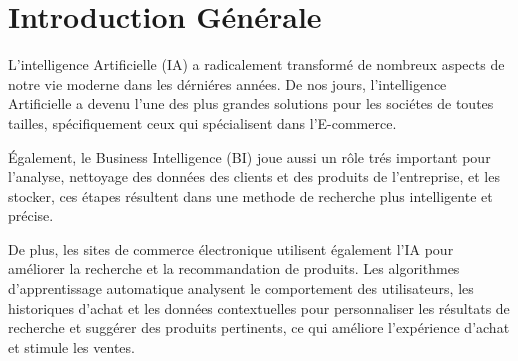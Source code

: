 \chapter{Introduction Générale}
\localtableofcontents

\newpage

\noindent
L'intelligence Artificielle (IA) a radicalement transformé de nombreux aspects de notre vie moderne dans les dérniéres années. De nos jours, l'intelligence Artificielle a devenu l'une des plus grandes solutions pour les sociétes de toutes tailles, spécifiquement ceux qui spécialisent dans l'E-commerce.

\noindent
Également, le Business Intelligence (BI) joue aussi un rôle trés important pour l'analyse, nettoyage des données des clients et des produits de l'entreprise, et les stocker, ces étapes résultent dans une methode de recherche plus intelligente et précise.

\noindent
De plus, les sites de commerce électronique utilisent également l'IA pour améliorer la recherche et la recommandation de produits. Les algorithmes d'apprentissage automatique analysent le comportement des utilisateurs, les historiques d'achat et les données contextuelles pour personnaliser les résultats de recherche et suggérer des produits pertinents, ce qui améliore l'expérience d'achat et stimule les ventes.

\newpage